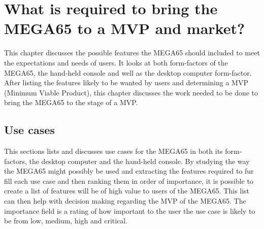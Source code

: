 
\chapter{What is required to bring the MEGA65 to a MVP and market?}
\label{Chapter7}
This chapter discusses the possible features the MEGA65 should included to meet the expectations and needs of users. It looks at both form-factors of the MEGA65, the hand-held console and well as the desktop computer form-factor. After listing the features likely to be wanted by users and determining a MVP (Minimum Viable Product), this chapter discusses the work needed to be done to bring the MEGA65 to the stage of a MVP.


\section{Use cases}
This sections lists and discusses use cases for the MEGA65 in both its form-factors, the desktop computer and the hand-held console. By studying the way the MEGA65 might possibly be used and extracting the features required to fur fill each use case and then ranking them in order of importance, it is possible to create a list of features will be of high value to users of the MEGA65. This list can then help with decision making regarding the MVP of the MEGA65. The importance field is a rating of how important to the user the use case is likely to be from low, medium, high and critical. 

